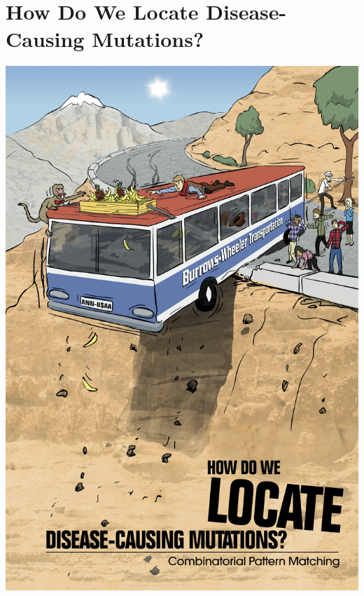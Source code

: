 \documentclass{article}
\begin{document}
\section{How Do We Locate Disease-Causing Mutations?\\ }
\begin{center}
    \includegraphics[scale=0.72]{c9/c9.jpg}
\end{center}
\pagebreak
\end{document}

